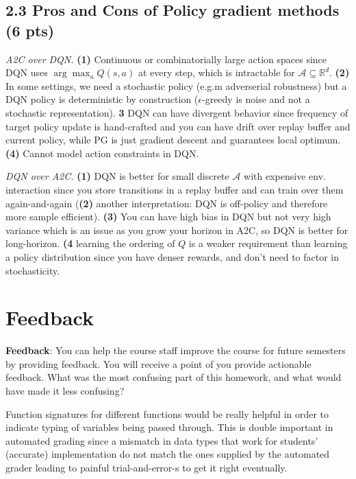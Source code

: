 \documentclass[12pt]{article}
\newcommand{\R}{\mathbb{R}}
\begin{document}
\subsection*{2.3 Pros and Cons of Policy gradient methods (6 pts)}
\begin{solution}[height=8cm]
\emph{A2C over DQN.} \textbf{(1)} Continuous or combinatorially large action spaces since DQN uses $\arg\max_a Q(s,a)$ at every step, which is intractable for $\mathcal{A}\subseteq\R^d$. \textbf{(2)} In some settings, we need a stochastic policy (e.g.m adverserial robustness) but a DQN policy is deterministic by construction ($\epsilon$-greedy is noise and not a stochastic representation). \textbf{3} DQN can have divergent behavior since frequency of target policy update is hand-crafted and you can have drift over replay buffer and current policy, while PG is just gradient descent and guarantees local optimum. \textbf{(4)} Cannot model action constraints in DQN.

\emph{DQN over A2C.} \textbf{(1)} DQN is better for small discrete $\mathcal{A}$ with expensive env. interaction since you store transitions in a replay buffer and can train over them again-and-again (\textbf{(2)} another interpretation: DQN is off-policy and therefore more sample efficient). \textbf{(3)} You can have high bias in DQN but not very high variance which is an issue as you grow your horizon in A2C, so DQN is better for long-horizon. \textbf{(4} learning the ordering of $Q$ is a weaker requirement than learning a policy distribution since you have denser rewards, and don't need to factor in stochasticity.
\end{solution}

\clearpage
\section*{Feedback}

\textbf{Feedback}: You can help the course staff improve the course for future semesters by providing feedback. You will receive a point of you provide actionable feedback. What was the most confusing part of this homework, and what would have made it less confusing?
\begin{solution}[height=4cm]
Function signatures for different functions would be really helpful in order to indicate typing of variables being passed through. This is double important in automated grading since a mismatch in data types that work for students' (accurate) implementation do not match the ones supplied by the automated grader leading to painful trial-and-error-s to get it right eventually. 
\end{solution}
\end{document}
